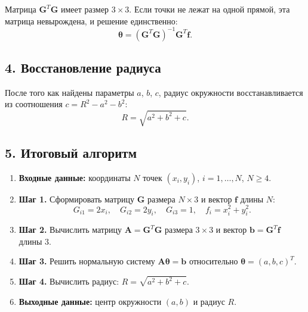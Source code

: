 \documentclass{article}
\begin{document}
Матрица $\mathbf{G}^T \mathbf{G}$ имеет размер $3 \times 3$. Если точки не лежат на одной прямой, эта матрица невырождена, и решение единственно:
\begin{equation}
\boldsymbol{\theta} = (\mathbf{G}^T \mathbf{G})^{-1} \mathbf{G}^T \mathbf{f}.
\label{eq:43_sol}
\end{equation}

\subsection*{4. Восстановление радиуса}

После того как найдены параметры $a$, $b$, $c$, радиус окружности восстанавливается из соотношения $c = R^2 - a^2 - b^2$:
\begin{equation}
R = \sqrt{a^2 + b^2 + c}.
\end{equation}

\subsection*{5. Итоговый алгоритм}

\begin{enumerate}
\item \textbf{Входные данные:} координаты $N$ точек $(x_i, y_i)$, $i = 1, \ldots, N$, $N \geqslant 4$.

\item \textbf{Шаг 1.} Сформировать матрицу $\mathbf{G}$ размера $N \times 3$ и вектор $\mathbf{f}$ длины $N$:
\begin{equation}
G_{i1} = 2x_i, \quad G_{i2} = 2y_i, \quad G_{i3} = 1, \quad f_i = x_i^2 + y_i^2.
\end{equation}

\item \textbf{Шаг 2.} Вычислить матрицу $\mathbf{A} = \mathbf{G}^T \mathbf{G}$ размера $3 \times 3$ и вектор $\mathbf{b} = \mathbf{G}^T \mathbf{f}$ длины $3$.

\item \textbf{Шаг 3.} Решить нормальную систему $\mathbf{A} \boldsymbol{\theta} = \mathbf{b}$ относительно $\boldsymbol{\theta} = (a, b, c)^T$.

\item \textbf{Шаг 4.} Вычислить радиус: $R = \sqrt{a^2 + b^2 + c}$.

\item \textbf{Выходные данные:} центр окружности $(a, b)$ и радиус $R$.
\end{enumerate}
\end{document}
